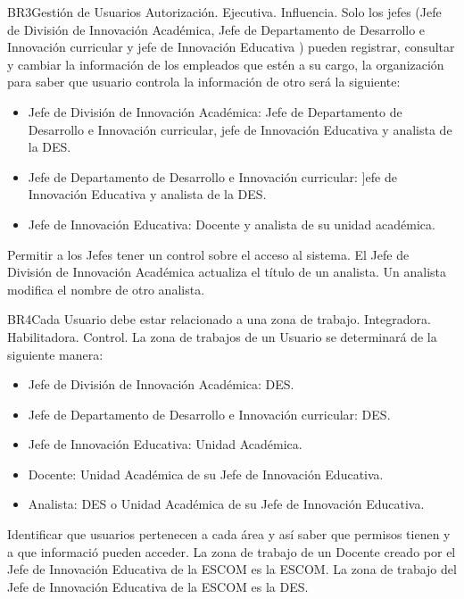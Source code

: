 \begin{BussinesRule}{BR3}{Gestión de Usuarios}
    \BRitem[Tipo:] Autorización.
    \BRitem[Clase:] Ejecutiva.
    \BRitem[Nivel:] Influencia.
    \BRitem[Descripción:] Solo los jefes (Jefe de División de Innovación Académica, Jefe de Departamento de Desarrollo e Innovación curricular y jefe de Innovación Educativa ) pueden registrar, consultar y cambiar  la información de los empleados que estén a su cargo, la organización para saber que usuario controla  la información de otro  será la siguiente:
    \begin{itemize}
        \item Jefe de División de Innovación Académica: Jefe de Departamento de Desarrollo e Innovación curricular, jefe de Innovación Educativa y analista de la DES.
        \item Jefe de Departamento de Desarrollo e Innovación curricular: ]efe de Innovación Educativa y analista de la DES.
        \item Jefe de Innovación Educativa: Docente y analista de su unidad académica.
    \end{itemize}
    \BRitem[Motivación:] Permitir a los Jefes tener un control sobre el acceso al sistema.
     El Jefe de División de Innovación Académica  actualiza el título de un analista.
     Un analista modifica  el nombre de otro analista.
\end{BussinesRule}
\begin{BussinesRule}{BR4}{Cada Usuario debe estar relacionado a una zona de trabajo.}
    \BRitem[Tipo:] Integradora.
    \BRitem[Clase:] Habilitadora.
    \BRitem[Nivel:] Control.
    \BRitem[Descripción:] La zona de trabajos de un Usuario se determinará de la siguiente manera:
    \begin{itemize}
        \item Jefe de División de Innovación Académica: DES.
        \item Jefe de Departamento de Desarrollo e Innovación curricular: DES.
        \item Jefe de Innovación Educativa: Unidad Académica.
        \item Docente: Unidad Académica de su Jefe de Innovación Educativa.
        \item Analista:  DES o Unidad Académica de su Jefe de Innovación Educativa.
    \end{itemize}
    \BRitem[Motivación:] Identificar que usuarios pertenecen a cada área y así saber que permisos tienen y a que informació pueden acceder.
     La zona de trabajo de un Docente creado por el Jefe de Innovación Educativa de la ESCOM es la ESCOM.
     La zona de trabajo del Jefe de Innovación Educativa de la ESCOM es la DES.
\end{BussinesRule}
